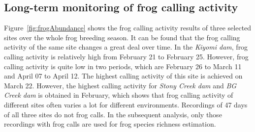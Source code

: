 \subsection{Long-term monitoring of frog calling activity}

Figure~\ref{fig:frogAbundance} shows the frog calling activity results of three selected sites over the whole frog breeding season. It can be found that the frog calling activity of the same site changes a great deal over time. In the \textit{Kiyomi dam}, frog calling activity is relatively high from February 21 to February 25. However, frog calling activity is quite low in two periods, which are February 26 to March 11 and April 07 to April 12. The highest calling activity of this site is achieved on March 22. However, the highest calling activity for \textit{Stony Creek dam} and \textit{BG Creek dam} is obtained in February, which shows that frog calling activity of different sites often varies a lot for different environments. Recordings of 47 days of all three sites do not frog calls. In the subsequent analysis, only those recordings with frog calls are used for frog species richness estimation. 

